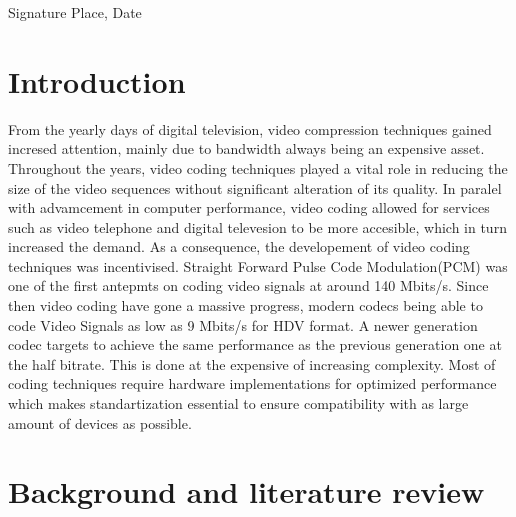 \documentclass[a4paper,11pt,oneside]{article}
\begin{document}
  \vspace{20mm}

  Signature \hfill Place, Date

  \newpage
  \begin{abstract}
 
  
  \end{abstract}

  
  \clearpage

  \fi

  \newpage
  \tableofcontents

  \newpage
  \listoffigures

  \newpage

  \section{Introduction}
  \indent From the yearly days of digital television, video compression techniques gained incresed attention, mainly due to bandwidth always being 
  an expensive asset. Throughout the years, video coding techniques played a vital role in reducing the size of the video sequences without significant
  alteration of its quality. In paralel with advamcement in computer performance, video coding allowed for services such as video telephone and digital 
  televesion to be more accesible, which in turn increased the demand. As a consequence, the developement of video coding techniques was incentivised. 
  Straight Forward Pulse Code Modulation(PCM) was one of the first antepmts on coding video signals at around 140 Mbits/s. Since then video coding 
  have gone a massive progress, modern codecs being able to code Video Signals as low as 9 Mbits/s for HDV format. A newer generation codec targets 
  to achieve the same performance as the previous generation one at the half bitrate. This is done at the expensive of increasing complexity. Most of coding
  techniques require hardware implementations for optimized performance which makes standartization essential to ensure compatibility with as large amount of devices 
  as possible.\cite{stcodec}
  \newpage
  \section{Background and literature review}
  
\end{document}
